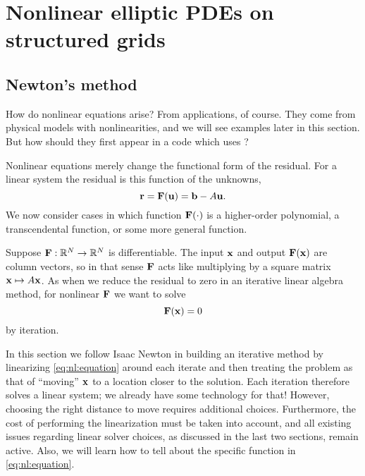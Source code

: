 \renewcommand{\CODELOC}{c/ch4/}

\chapter{Nonlinear elliptic PDEs on structured grids}
\label{chap:nonlinear}

\section{Newton's method}

How do nonlinear equations arise?  From applications, of course.  They come from physical models with nonlinearities, and we will see examples later in this section.  But how should they first appear in a code which uses \PETSc?

Nonlinear equations merely change the functional form of the residual.  For a linear system the residual is this function of the unknowns,
\begin{equation}
\mathbf{r} = \mathbf{F}(\mathbf{u}) = \mathbf{b} - A \mathbf{u}. \label{eq:nl:linres}
\end{equation}
We now consider cases in which function $\mathbf{F}(\cdot)$ is a higher-order polynomial, a transcendental function, or some more general function.

Suppose $\mathbf{F} : \mathbb{R}^N \to \mathbb{R}^N$ is differentiable.  The input $\mathbf{x}$ and output $\mathbf{F}(\mathbf{x})$ are column vectors, so in that sense $\mathbf{F}$ acts like multiplying by a square matrix $\mathbf{x}\mapsto A\mathbf{x}$.  As when we reduce the residual to zero in an iterative linear algebra method, for nonlinear $\mathbf{F}$ we want to solve
\begin{equation}
   \mathbf{F}(\mathbf{x}) = 0   \label{eq:nl:equation}
\end{equation}
by iteration.

In this section we follow Isaac Newton in building an iterative method by linearizing \eqref{eq:nl:equation} around each iterate and then treating the problem as that of ``moving'' $\mathbf{x}$ to a location closer to the solution.  Each iteration therefore solves a linear system; we already have some technology for that!  However, choosing the right distance to move requires additional choices.  Furthermore, the cost of performing the linearization must be taken into account, and all existing issues regarding linear solver choices, as discussed in the last two sections, remain active.  Also, we will learn how to tell \PETSc about the specific function in \eqref{eq:nl:equation}.

